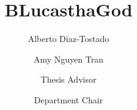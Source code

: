 \documentclass{scu-thesis}
\author{Alberto Diaz-Tostado}
\author{Amy Nguyen Tran}
\title{BLucasthaGod}
\begin{document}
\frontmatter
\signature{Thesis Advisor}
\signature{Department Chair}

\maketitle


\tableofcontents
\listoffigures

\mainmatter




\backmatter
\immediate{}
\end{document}
